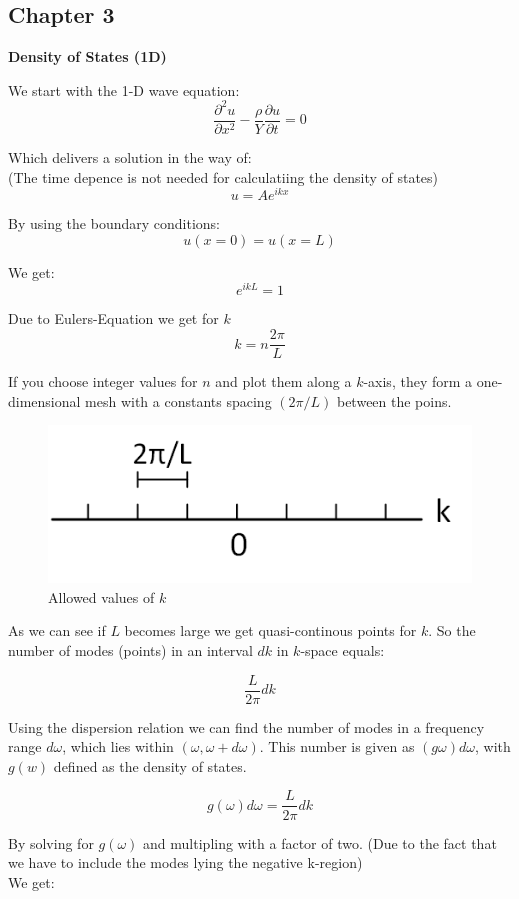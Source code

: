 \subsection{Chapter 3}

\textbf{Density of States (1D)}

We start with the 1-D wave equation:
$$\frac{\partial^2 u}{\partial x^2} - \frac{\rho}{Y} \frac{\partial u}{\partial t} = 0$$

Which delivers a solution in the way of:\\
(The time depence is not needed for calculatiing the density of states)
\begin{equation}
    u = Ae^{ikx}
    \label{eq:sol_1d_wave}
\end{equation}

By using the boundary conditions:
$$u(x=0) = u(x=L)$$

We get:
$$e^{ikL} = 1$$

Due to Eulers-Equation we get for $k$
$$k = n \frac{2\pi}{L}$$

If you choose integer values for $n$ and plot them along a $k$-axis, they form
a one-dimensional mesh with a constants spacing $(2\pi/L)$ between the poins.

\begin{figure}[H]
	\centering
	\includegraphics[width=0.4\linewidth]{Graphics/Chapter3/allowed_values_k_1D}
	\caption{Allowed values of $k$}
	\label{}
\end{figure}

As we can see if $L$ becomes large we get quasi-continous points for $k$. So the 
number of modes (points) in an interval $dk$ in $k$-space equals:

$$\dfrac{L}{2\pi} dk$$

Using the dispersion relation we can find the number of modes in a frequency
range $d\omega$, which lies within $(\omega, \omega + d\omega)$.
This number is given as $(g\omega)d\omega$, with
$g(w)$ defined as the density of states.

$$g(\omega) d\omega =\dfrac{L}{2\pi} dk$$

By solving for $g(\omega)$ and multipling with a factor of two.
(Due to the fact that we have to include the modes lying the negative k-region)\\
We get:

